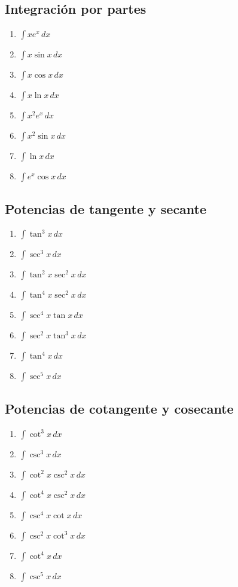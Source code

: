 \documentclass[12pt]{article}
\theoremstyle{definition}
\theoremstyle{remark}
\begin{document}
\subsection{Integración por partes}
\begin{enumerate}[label=\arabic*.,start=177]
\item $\displaystyle \int x e^x\,dx$
\item $\displaystyle \int x\sin x\,dx$
\item $\displaystyle \int x\cos x\,dx$
\item $\displaystyle \int x\ln x\,dx$
\item $\displaystyle \int x^2e^x\,dx$
\item $\displaystyle \int x^2\sin x\,dx$
\item $\displaystyle \int \ln x\,dx$
\item $\displaystyle \int e^x\cos x\,dx$
\end{enumerate}

\subsection{Potencias de tangente y secante}
\begin{enumerate}[label=\arabic*.,start=185]
\item $\displaystyle \int \tan^3x\,dx$
\item $\displaystyle \int \sec^3x\,dx$
\item $\displaystyle \int \tan^2x\sec^2x\,dx$
\item $\displaystyle \int \tan^4x\sec^2x\,dx$
\item $\displaystyle \int \sec^4x\tan x\,dx$
\item $\displaystyle \int \sec^2x\tan^3x\,dx$
\item $\displaystyle \int \tan^4x\,dx$
\item $\displaystyle \int \sec^5x\,dx$
\end{enumerate}

\subsection{Potencias de cotangente y cosecante}
\begin{enumerate}[label=\arabic*.,start=193]
\item $\displaystyle \int \cot^3x\,dx$
\item $\displaystyle \int \csc^3x\,dx$
\item $\displaystyle \int \cot^2x\csc^2x\,dx$
\item $\displaystyle \int \cot^4x\csc^2x\,dx$
\item $\displaystyle \int \csc^4x\cot x\,dx$
\item $\displaystyle \int \csc^2x\cot^3x\,dx$
\item $\displaystyle \int \cot^4x\,dx$
\item $\displaystyle \int \csc^5x\,dx$
\end{enumerate}
\end{document}

